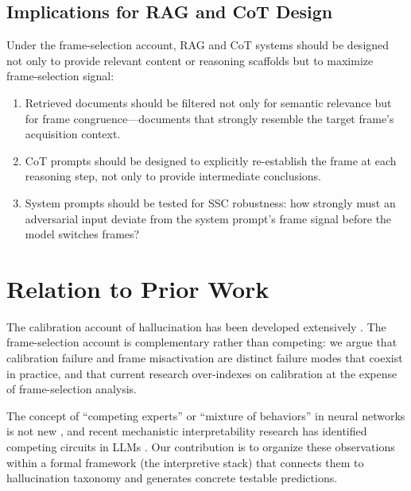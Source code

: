 \documentclass[12pt]{article}
\begin{document}
\subsection{Implications for RAG and CoT Design}

Under the frame-selection account, RAG and CoT systems should
be designed not only to provide relevant content or reasoning
scaffolds but to maximize frame-selection signal:

\begin{enumerate}[label=(\roman*)]
\item Retrieved documents should be filtered not only for
semantic relevance but for frame congruence---documents that
strongly resemble the target frame's acquisition context.
\item CoT prompts should be designed to explicitly re-establish
the frame at each reasoning step, not only to provide
intermediate conclusions.
\item System prompts should be tested for SSC robustness:
how strongly must an adversarial input deviate from the system
prompt's frame signal before the model switches frames?
\end{enumerate}

\section{Relation to Prior Work}

The calibration account of hallucination has been developed
extensively \cite{kadavath2022, lin2022, xiong2024}. The
frame-selection account is complementary rather than competing:
we argue that calibration failure and frame misactivation are
distinct failure modes that coexist in practice, and that
current research over-indexes on calibration at the expense of
frame-selection analysis.

The concept of ``competing experts'' or ``mixture of behaviors''
in neural networks is not new \cite{jacobs1991, jordan1994},
and recent mechanistic interpretability research has identified
competing circuits in LLMs \cite{conmy2023towards, bricken2023monosemanticity}. Our contribution
is to organize these observations within a formal framework
(the interpretive stack) that connects them to hallucination
taxonomy and generates concrete testable predictions.
\end{document}

